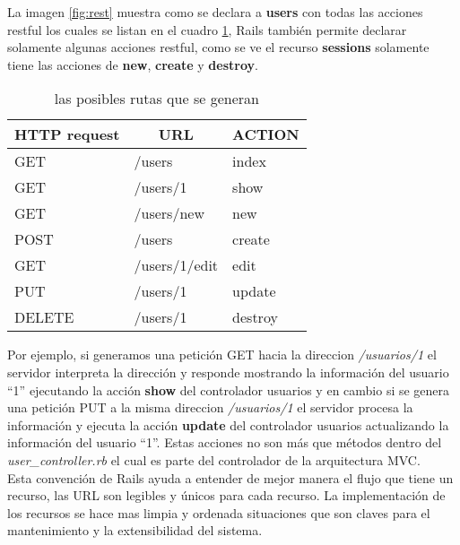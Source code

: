       La imagen \ref{fig:rest} muestra como se declara a \textbf{users} con 
      todas las acciones restful los cuales se listan en el cuadro \ref{tab:rest},  
      Rails también permite declarar solamente algunas acciones restful,
      como se ve el recurso \textbf{sessions} solamente tiene las acciones de \textbf{new}, \textbf{create} y \textbf{destroy}.\\
     

      \begin{table}[!hbp]
        \label{tab:rest}
        \begin{center}
          \begin{tabular}{ lll }
            \multicolumn{1}{c}{\textbf{HTTP request}} & \multicolumn{1}{c}{\textbf{URL}}  & \multicolumn{1}{c}{\textbf{ACTION}} \\
            \toprule
            GET     &   /users         &   index \\ %
            GET     &   /users/1       &   show \\
            GET     &   /users/new     &   new \\
            POST    &   /users         &   create \\
            GET     &   /users/1/edit  &   edit \\
            PUT     &   /users/1       &   update \\
            DELETE  &   /users/1       &   destroy \\
            \bottomrule
          \end{tabular}
          \caption[recursos REST]{las posibles rutas que se generan}
        \end{center}
      \end{table}

      Por ejemplo, si generamos una petición GET hacia la direccion  \emph{/usuarios/1} el servidor interpreta la dirección y responde mostrando la información del usuario “1” ejecutando la acción \textbf{show} del controlador usuarios y en cambio si se genera una petición PUT a la misma direccion \emph{/usuarios/1} el servidor procesa la información y ejecuta la acción \textbf{update} del controlador usuarios actualizando la información del usuario “1”. Estas acciones no son más que métodos dentro del \emph{user\_controller.rb} el cual es parte del controlador de la arquitectura MVC.\\

      Esta convención de Rails ayuda a entender de mejor manera el flujo que tiene un recurso, 
      las URL son legibles y únicos para cada recurso. La implementación de los recursos se hace mas limpia y ordenada situaciones que son claves para el mantenimiento y la extensibilidad del sistema.

